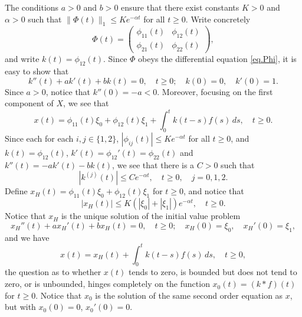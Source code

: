 \documentclass[10pt,reqno]{amsart}
\theoremstyle{definition}
\begin{document}
	The conditions $a>0$ and $b>0$ ensure that there exist constants $K>0$ and $\alpha>0$ such that $\|\Phi(t)\|_1\leq Ke^{-\alpha t}$ for all $t\geq 0$. Write concretely 
	\[
	\Phi(t)=\left(\begin{matrix}
		\phi_{11}(t) & \phi_{12}(t) \\
		\phi_{21}(t) & \phi_{22}(t)
	\end{matrix}\right),
	\]    
	and write $k(t)=\phi_{12}(t)$. Since $\Phi$ obeys the differential equation \eqref{eq.Phi}, it is easy to show that 
	\begin{equation} \label{eq.k}
		k''(t)+ak'(t)+bk(t)=0, \quad t\geq 0; \quad k(0)=0, \quad k'(0)=1.
	\end{equation}
	Since $a>0$, notice that $k''(0)=-a<0$. 
	Moreover, focusing on the first component of $X$, we see that 
	\[
	x(t)=\phi_{11}(t)\xi_0+\phi_{12}(t)\xi_1+\int_0^t k(t-s)f(s)\,ds, \quad t\geq 0.
	\]
	Since each for each $i,j\in \{1,2\}$, $|\phi_{ij}(t)|\leq Ke^{-\alpha t}$ for all $t\geq 0$, and $k(t)=\phi_{12}(t)$, $k'(t)=\phi_{12}'(t)=\phi_{22}(t)$ and $k''(t)=-ak'(t)-bk(t)$, we see that there is a $C>0$ such that 
	\[
	|k^{(j)}(t)|\leq Ce^{-\alpha t}, \quad t\geq 0, \quad j=0,1,2.
	\]
	Define $x_H(t)=\phi_{11}(t)\xi_0+\phi_{12}(t) \xi_1$ for $t\geq 0$, and notice that 
	\[
	|x_H(t)|\leq K(|\xi_0|+|\xi_1|)e^{-\alpha t}, \quad t\geq 0.
	\]
	Notice that $x_H$ is the unique solution of the initial value problem 
	\begin{equation} \label{eq.xHeqn}
		x_H''(t)+ax_H'(t)+bx_H(t)=0, \quad t\geq 0; \quad x_H(0)=\xi_0, \quad x_H'(0)=\xi_1,
	\end{equation}
	and we have 
	\begin{equation} \label{eq.xrepkastf}
		x(t)=x_H(t)+\int_0^t k(t-s)f(s)\,ds, \quad t\geq 0,
	\end{equation}
	the question as to whether $x(t)$ tends to zero, is bounded but does not tend to zero, or is unbounded, hinges completely on the function $x_0(t)=(k\ast f)(t)$ for $t\geq 0$. Notice that $x_0$ is the solution of the same second order equation as $x$, but with $x_0(0)=0$, $x_0'(0)=0$. 
	
\end{document}
